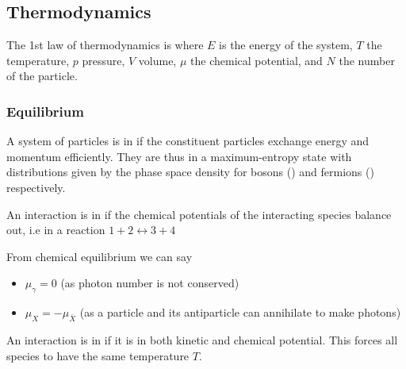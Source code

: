 \documentclass{article}
\begin{document}
\subsection{Thermodynamics}
\begin{definition}
The 1st law of thermodynamics is 
where $E$ is the energy of the system, $T$ the temperature, $p$ pressure, $V$ volume, $\mu$ the chemical potential, and $N$ the number of the particle. 
\end{definition}

\subsubsection*{Equilibrium}
\begin{definition}
A system of particles is in  if the constituent particles exchange energy and momentum efficiently. They are thus in a maximum-entropy state with distributions given by 
the phase space density for bosons () and fermions () respectively. 
\end{definition}

\begin{definition}
An interaction is in  if the chemical potentials of the interacting species balance out, i.e in a reaction $1 + 2 \leftrightarrow 3 + 4$
\end{definition}

\begin{lemma}
From chemical equilibrium we can say 
\begin{itemize}
    \item $\mu_\gamma = 0$ (as photon number is not conserved)
    \item $\mu_X = -\mu_{\bar{X}}$ (as a particle and its antiparticle can annihilate to make photons)
\end{itemize}
\end{lemma}

\begin{definition}
An interaction is in  if it is in both kinetic and chemical potential. This forces all species to have the same temperature $T$. 
\end{definition}
\end{document}

